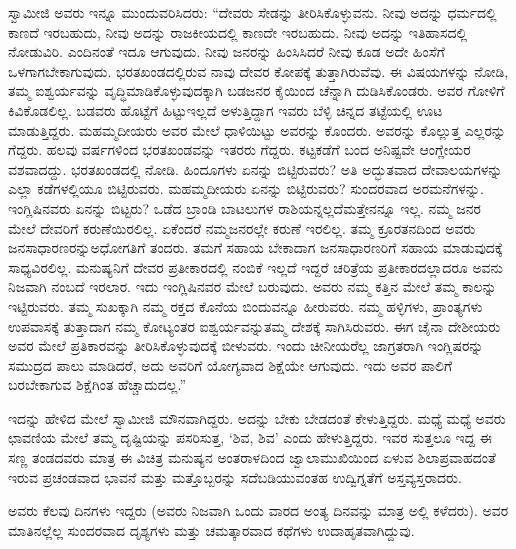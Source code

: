 ಸ್ವಾಮೀಜಿ ಅವರು ಇನ್ನೂ ಮುಂದುವರಿಸಿದರು: “ದೇವರು ಸೇಡನ್ನು ತೀರಿಸಿಕೊಳ್ಳುವನು. ನೀವು ಅದನ್ನು ಧರ್ಮದಲ್ಲಿ ಕಾಣದೆ ಇರಬಹುದು, ನೀವು ಅದನ್ನು ರಾಜಕೀಯದಲ್ಲಿ ಕಾಣದೇ ಇರಬಹುದು. ನೀವು ಅದನ್ನು ಇತಿಹಾಸದಲ್ಲಿ ನೋಡುವಿರಿ. ಎಂದಿನಂತೆ ಇದೂ ಆಗುವುದು. ನೀವು ಜನರನ್ನು ಹಿಂಸಿಸಿದರೆ ನೀವು ಕೂಡ ಅದೇ ಹಿಂಸೆಗೆ ಒಳಗಾಗಬೇಕಾಗುವುದು. ಭರತಖಂಡದಲ್ಲಿರುವ ನಾವು ದೇವರ ಕೋಪಕ್ಕೆ ತುತ್ತಾಗಿರುವೆವು. ಈ ವಿಷಯಗಳನ್ನು ನೋಡಿ, ತಮ್ಮ ಐಶ್ವರ್ಯವನ್ನು ವೃದ್ಧಿಮಾಡಿಕೊಳ್ಳುವುದಕ್ಕಾಗಿ ಬಡಜನರ ಕೈಯಿಂದ ಚೆನ್ನಾಗಿ ದುಡಿಸಿಕೊಂಡರು. ಅವರ ಗೋಳಿಗೆ ಕಿವಿಕೊಡಲಿಲ್ಲ. ಬಡವರು ಹೊಟ್ಟೆಗೆ ಹಿಟ್ಟು\break ಇಲ್ಲದೆ ಅಳುತ್ತಿದ್ದಾಗ ಇವರು ಬೆಳ್ಳಿ ಚಿನ್ನದ ತಟ್ಟೆಯಲ್ಲಿ ಊಟ ಮಾಡುತ್ತಿದ್ದರು. ಮಹಮ್ಮದೀ\-ಯರು ಅವರ ಮೇಲೆ ಧಾಳಿಯಿಟ್ಟು ಅವರನ್ನು ಕೊಂದರು. ಅವರನ್ನು ಕೊಲ್ಲುತ್ತ ಎಲ್ಲರನ್ನು ಗೆದ್ದರು. ಹಲವು ವರ್ಷಗಳಿಂದ ಭರತಖಂಡವನ್ನು ಇತರರು ಗೆದ್ದರು. ಕಟ್ಟಕಡೆಗೆ ಬಂದ ಅನಿಷ್ಟವೇ ಆಂಗ್ಲೇಯರ ವಶವಾದದ್ದು. ಭರತಖಂಡದಲ್ಲಿ ನೋಡಿ. ಹಿಂದೂಗಳು ಏನನ್ನು ಬಿಟ್ಟಿರುವರು? ಅತಿ ಅದ್ಭುತವಾದ ದೇವಾಲಯಗಳನ್ನು ಎಲ್ಲಾ ಕಡೆಗಳಲ್ಲಿಯೂ ಬಿಟ್ಟಿರುವರು. ಮಹಮ್ಮದೀಯರು ಏನನ್ನು ಬಿಟ್ಟಿರುವರು? ಸುಂದರವಾದ ಅರಮನೆಗಳನ್ನು. ಇಂಗ್ಲಿಷಿನವರು ಏನನ್ನು ಬಿಟ್ಟರು? ಒಡೆದ ಬ್ರಾಂಡಿ ಬಾಟಲುಗಳ ರಾಶಿಯನ್ನಲ್ಲದೆ\break ಮತ್ತೇನನ್ನೂ ಇಲ್ಲ. ನಮ್ಮ ಜನರ ಮೇಲೆ ದೇವರಿಗೆ ಕರುಣೆಯಿರಲಿಲ್ಲ. ಏಕೆಂದರೆ ನಮ್ಮ\break ಜನರಲ್ಲೇ ಕರುಣೆ ಇರಲಿಲ್ಲ. ತಮ್ಮ ಕ್ರೂರತನದಿಂದ ಅವರು ಜನಸಾಧಾರಣರನ್ನು\break ಅಧೋಗತಿಗೆ ತಂದರು. ತಮಗೆ ಸಹಾಯ ಬೇಕಾದಾಗ ಜನಸಾಧಾರಣರಿಗೆ ಸಹಾಯ ಮಾಡುವುದಕ್ಕೆ ಸಾಧ್ಯವಿರಲಿಲ್ಲ. ಮನುಷ್ಯನಿಗೆ ದೇವರ ಪ್ರತೀಕಾರದಲ್ಲಿ ನಂಬಿಕೆ ಇಲ್ಲದೆ ಇದ್ದರೆ ಚರಿತ್ರೆಯ ಪ್ರತೀಕಾರದಲ್ಲಾದರೂ ಅವನು ನಿಜವಾಗಿ ನಂಬದೆ ಇರಲಾರ. ಇದು ಇಂಗ್ಲಿಷಿನವರ ಮೇಲೆ ಬರುವುದು. ಅವರು ನಮ್ಮ ಕತ್ತಿನ ಮೇಲೆ ತಮ್ಮ ಕಾಲನ್ನು ಇಟ್ಟಿರುವರು. ತಮ್ಮ ಸುಖಕ್ಕಾಗಿ ನಮ್ಮ ರಕ್ತದ ಕೊನೆಯ ಬಿಂದುವನ್ನೂ ಹೀರುವರು. ನಮ್ಮ ಹಳ್ಳಿಗಳು, ಪ್ರಾಂತ್ಯಗಳು ಉಪವಾಸಕ್ಕೆ ತುತ್ತಾದಾಗ ನಮ್ಮ ಕೋಟ್ಯಂತರ ಐಶ್ವರ್ಯವನ್ನು\break ತಮ್ಮ ದೇಶಕ್ಕೆ ಸಾಗಿಸಿರುವರು. ಈಗ ಚೈನಾ ದೇಶೀಯರು ಅವರ ಮೇಲೆ ಪ್ರತಿಕಾರವನ್ನು ತೀರಿಸಿಕೊಳ್ಳುವುದಕ್ಕೆ ಬೀಳುವರು. ಇಂದು ಚೀನೀಯರೆಲ್ಲ ಜಾಗ್ರತರಾಗಿ ಇಂಗ್ಲಿಷರನ್ನು ಸಮುದ್ರದ ಪಾಲು ಮಾಡಿದರೆ, ಅದು ಅವರಿಗೆ ಯೋಗ್ಯವಾದ ಶಿಕ್ಷೆಯೇ ಆಗುವುದು. ಇದು ಅವರ ಪಾಲಿಗೆ ಬರಬೇಕಾಗುವ ಶಿಕ್ಷೆಗಿಂತ ಹೆಚ್ಚಾದುದಲ್ಲ.”

\vskip 7pt

ಇದನ್ನು ಹೇಳಿದ ಮೇಲೆ ಸ್ವಾಮೀಜಿ ಮೌನವಾಗಿದ್ದರು. ಅದನ್ನು ಬೇಕು ಬೇಡದಂತೆ ಕೇಳುತ್ತಿದ್ದರು. ಮಧ್ಯೆ ಮಧ್ಯೆ ಅವರು ಛಾವಣಿಯ ಮೇಲೆ ತಮ್ಮ ದೃಷ್ಟಿಯನ್ನು ಪಸರಿಸುತ್ತ, ‘ಶಿವ, ಶಿವ’ ಎಂದು ಹೇಳುತ್ತಿದ್ದರು. ಇವರ ಸುತ್ತಲೂ ಇದ್ದ ಈ ಸಣ್ಣ ತಂಡದವರು ಮಾತ್ರ ಈ ವಿಚಿತ್ರ ಮನುಷ್ಯನ ಅಂತರಾಳದಿಂದ ಜ್ವಾಲಾಮುಖಿಯಿಂದ ಏಳುವ ಶಿಲಾಪ್ರವಾಹದಂತೆ ಇರುವ ಪ್ರಚಂಡವಾದ ಭಾವನೆ ಮತ್ತು ಮತ್ತೊಬ್ಬರನ್ನು ಸದೆಬಡಿಯುವಂತಹ ಉದ್ವಿಗ್ನತೆಗೆ ಅಸ್ತವ್ಯಸ್ತರಾದರು.

\vskip 7pt

ಅವರು ಕೆಲವು ದಿನಗಳು ಇದ್ದರು (ಅವರು ನಿಜವಾಗಿ ಒಂದು ವಾರದ ಅಂತ್ಯ ದಿನವನ್ನು ಮಾತ್ರ ಅಲ್ಲಿ ಕಳೆದರು). ಅವರ ಮಾತಿನಲ್ಲೆಲ್ಲ ಸುಂದರವಾದ ದೃಶ್ಯಗಳು ಮತ್ತು ಚಮತ್ಕಾರವಾದ ಕಥೆಗಳು ಉದಾಹೃತವಾಗಿದ್ದುವು.

\vskip 7pt

